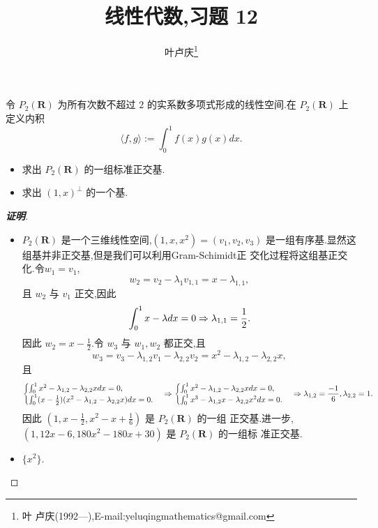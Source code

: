 ﻿\documentclass[a4paper]{article}
\begin{document}
\title{\huge{\bf{线性代数,习题 12}}} \author{\small{叶卢庆\footnote{叶
      卢庆(1992---),E-mail:yeluqingmathematics@gmail.com}}}
\maketitle\ni
\begin{exercise}
令 $P_2(\mathbf{R})$ 为所有次数不超过
$2$ 的实系数多项式形成的线性空间.在 $P_2(\mathbf{R})$ 上定义内积
$$
\langle f,g\rangle:=\int_0^1f(x)g(x)dx.
$$
\begin{itemize}
\item 求出 $P_2(\mathbf{R})$ 的一组标准正交基.
\item 求出 $(1,x)^{\bot}$ 的一个基.
\end{itemize}
\end{exercise}
\begin{proof}[\textbf{证明}]
  \begin{itemize}
  \item $P_2(\mathbf{R})$ 是一个三维线性空间,$(1,x,x^2)=(v_1,v_2,v_3)$
    是一组有序基.显然这组基并非正交基,但是我们可以利用Gram-Schimidt正
    交化过程将这组基正交化.令$w_1=v_1$,
$$
w_2=v_2-\lambda_1v_{1,1}=x-\lambda_{1,1},
$$
且 $w_2$ 与 $v_1$ 正交,因此
$$
\int_0^1x-\lambda dx=0\Rightarrow \lambda_{1,1}=\frac{1}{2}.
$$
因此 $w_2=x-\frac{1}{2}$.令 $w_3$ 与 $w_1,w_2$ 都正交,且
$$
w_3=v_3-\lambda_{1,2}v_1-\lambda_{2,2}v_2=x^2-\lambda_{1,2}-\lambda_{2,2}x,
$$
且
$$
\begin{cases}
  \int _0^1x^2-\lambda_{1,2}-\lambda_{2,2}xdx=0,\\
\int_0^1(x-\frac{1}{2})(x^2-\lambda_{1,2}-\lambda_{2,2}x)dx=0.
\end{cases}\Rightarrow
\begin{cases}
  \int _0^1x^2-\lambda_{1,2}-\lambda_{2,2}xdx=0,\\
\int_0^1x^3-\lambda_{1,2}x-\lambda_{2,2}x^{2}dx=0.
\end{cases}\Rightarrow \lambda_{1,2}=\frac{-1}{6},\lambda_{2,2}=1.
$$
因此 $(1,x-\frac{1}{2},x^2-x+\frac{1}{6})$ 是 $P_2(\mathbf{R})$ 的一组
正交基.进一步,$(1,12x-6,180x^2-180x+30)$ 是 $P_2(\mathbf{R})$ 的一组标
准正交基.
\item $\{x^2\}$.
  \end{itemize}
\end{proof}
\end{document}
